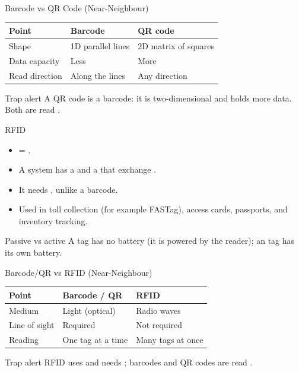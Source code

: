 \documentclass[aspectratio=169]{beamer}
\begin{document}
\begin{frame}{Barcode vs QR Code (Near-Neighbour)}
  \begin{center}
    \begin{tabular}{lll}
      \toprule
      \textbf{Point} & \textbf{Barcode} & \textbf{QR code} \\
      \midrule
      Shape & 1D parallel lines & 2D matrix of squares \\
      Data capacity & Less & More \\
      Read direction & Along the lines & Any direction \\
      \bottomrule
    \end{tabular}
  \end{center}
  \vspace{0.3cm}
  \begin{alertblock}{Trap alert}
    A QR code is  a barcode: it is two-dimensional and holds more
    data. Both are read .
  \end{alertblock}
\end{frame}

\begin{frame}{RFID}
  \begin{itemize}
    \item {} = .
    \item A system has a  and a  that exchange
      .
    \item It needs , unlike a barcode.
    \item Used in toll collection (for example FASTag), access cards,
      passports, and inventory tracking.
  \end{itemize}
  \begin{block}{Passive vs active}
    A  tag has no battery (it is powered by the reader); an
     tag has its own battery.
  \end{block}
\end{frame}

\begin{frame}{Barcode/QR vs RFID (Near-Neighbour)}
  \begin{center}
    \begin{tabular}{lll}
      \toprule
      \textbf{Point} & \textbf{Barcode / QR} & \textbf{RFID} \\
      \midrule
      Medium & Light (optical) & Radio waves \\
      Line of sight & Required & Not required \\
      Reading & One tag at a time & Many tags at once \\
      \bottomrule
    \end{tabular}
  \end{center}
  \vspace{0.3cm}
  \begin{alertblock}{Trap alert}
    RFID uses  and needs ; barcodes
    and QR codes are read .
  \end{alertblock}
\end{frame}
\end{document}
